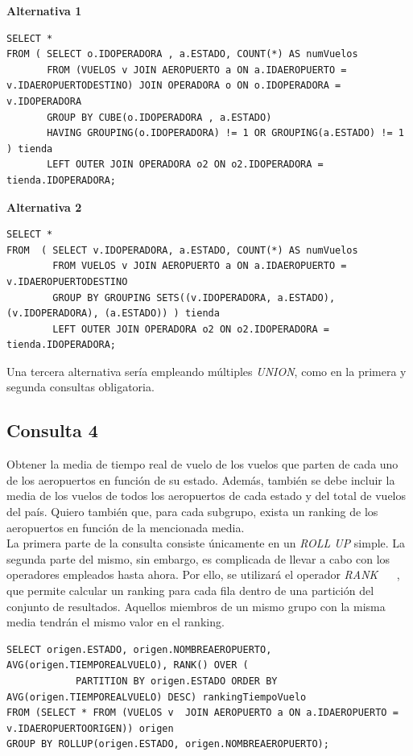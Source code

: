\documentclass{article}
\begin{document}
\textbf{Alternativa 1}
\begin{lstlisting}
SELECT *
FROM ( SELECT o.IDOPERADORA , a.ESTADO, COUNT(*) AS numVuelos
       FROM (VUELOS v JOIN AEROPUERTO a ON a.IDAEROPUERTO = v.IDAEROPUERTODESTINO) JOIN OPERADORA o ON o.IDOPERADORA = v.IDOPERADORA 
       GROUP BY CUBE(o.IDOPERADORA , a.ESTADO)
       HAVING GROUPING(o.IDOPERADORA) != 1 OR GROUPING(a.ESTADO) != 1 ) tienda
       LEFT OUTER JOIN OPERADORA o2 ON o2.IDOPERADORA = tienda.IDOPERADORA;
\end{lstlisting}

\textbf{Alternativa 2}
\begin{lstlisting}
SELECT *
FROM  ( SELECT v.IDOPERADORA, a.ESTADO, COUNT(*) AS numVuelos
        FROM VUELOS v JOIN AEROPUERTO a ON a.IDAEROPUERTO = v.IDAEROPUERTODESTINO 
        GROUP BY GROUPING SETS((v.IDOPERADORA, a.ESTADO), (v.IDOPERADORA), (a.ESTADO)) ) tienda
        LEFT OUTER JOIN OPERADORA o2 ON o2.IDOPERADORA = tienda.IDOPERADORA;
\end{lstlisting}

Una tercera alternativa sería empleando múltiples \textit{UNION}, como en la primera y segunda consultas obligatoria.


\subsection{Consulta 4}
Obtener la media de tiempo real de vuelo de los vuelos que parten de cada uno de los aeropuertos en función de su estado. Además, también se debe incluir la media de los vuelos de todos los aeropuertos de cada estado y del total de vuelos del país. Quiero también que, para cada subgrupo, exista un ranking de los aeropuertos en función de la mencionada media.\\

La primera parte de la consulta consiste únicamente en un \textit{ROLL UP} simple. La segunda parte del mismo, sin embargo, es complicada de llevar a cabo con los operadores empleados hasta ahora. Por ello, se utilizará el operador \textit{RANK} ~\cite{rank:1} ~\cite{rank:2}, que permite calcular un ranking para cada fila dentro de una partición del conjunto de resultados. Aquellos miembros de un mismo grupo con la misma media tendrán el mismo valor en el ranking.

\begin{lstlisting}
SELECT origen.ESTADO, origen.NOMBREAEROPUERTO, AVG(origen.TIEMPOREALVUELO), RANK() OVER ( 
			PARTITION BY origen.ESTADO ORDER BY AVG(origen.TIEMPOREALVUELO) DESC) rankingTiempoVuelo
FROM (SELECT * FROM (VUELOS v  JOIN AEROPUERTO a ON a.IDAEROPUERTO = v.IDAEROPUERTOORIGEN)) origen
GROUP BY ROLLUP(origen.ESTADO, origen.NOMBREAEROPUERTO);
\end{lstlisting}
\end{document}
